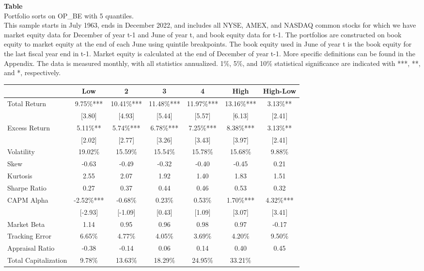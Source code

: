 \begin{table*}[ht!]
\raggedright
{}
\label{tab: quantile_sortOP_BE_with_5_quantiles}
\textbf{Table \thetable} \\
Portfolio sorts on OP\_BE with 5 quantiles. \\
\hspace*{1em}This sample starts in July 1963, ends in December 2022, and includes all NYSE, AMEX, and NASDAQ common stocks for which we have market equity data for December of year t-1 and June of year t, and book equity data for t-1. The portfolios are constructed on book equity to market equity at the end of each June using quintile breakpoints.  The book equity used in June of year t is the book equity for the last fiscal year end in t-1.  Market equity is calculated at the end of December of year t-1.  More specific definitions can be found in the Appendix.  The data is measured monthly, with all statistics annualized.  1\%, 5\%, and 10\% statistical significance are indicated with ***, **, and *, respectively. \\
\vspace{0.5em}
\centering
\begin{adjustbox}{max width=\textwidth}
\begin{tabular}{@{}lcccccc@{}}
\toprule
 & Low & 2 & 3 & 4 & High & High-Low \\
\midrule
Total Return & 9.75\%*** & 10.41\%*** & 11.48\%*** & 11.97\%*** & 13.16\%*** & 3.13\%** \\
 & [3.80] & [4.93] & [5.44] & [5.57] & [6.13] & [2.41] \\
Excess Return & 5.11\%** & 5.74\%*** & 6.78\%*** & 7.25\%*** & 8.38\%*** & 3.13\%** \\
 & [2.02] & [2.77] & [3.26] & [3.43] & [3.97] & [2.41] \\
Volatility & 19.02\% & 15.59\% & 15.54\% & 15.78\% & 15.68\% & 9.88\% \\
Skew & -0.63 & -0.49 & -0.32 & -0.40 & -0.45 & 0.21 \\
Kurtosis & 2.55 & 2.07 & 1.92 & 1.40 & 1.83 & 1.51 \\
Sharpe Ratio & 0.27 & 0.37 & 0.44 & 0.46 & 0.53 & 0.32 \\
CAPM Alpha & -2.52\%*** & -0.68\% & 0.23\% & 0.53\% & 1.70\%*** & 4.32\%*** \\
 & [-2.93] & [-1.09] & [0.43] & [1.09] & [3.07] & [3.41] \\
Market Beta & 1.14 & 0.95 & 0.96 & 0.98 & 0.97 & -0.17 \\
Tracking Error & 6.65\% & 4.77\% & 4.05\% & 3.69\% & 4.20\% & 9.50\% \\
Appraisal Ratio & -0.38 & -0.14 & 0.06 & 0.14 & 0.40 & 0.45 \\
Total Capitalization & 9.78\% & 13.63\% & 18.29\% & 24.95\% & 33.21\% &  \\
\bottomrule
\end{tabular}
\end{adjustbox}
\end{table*}